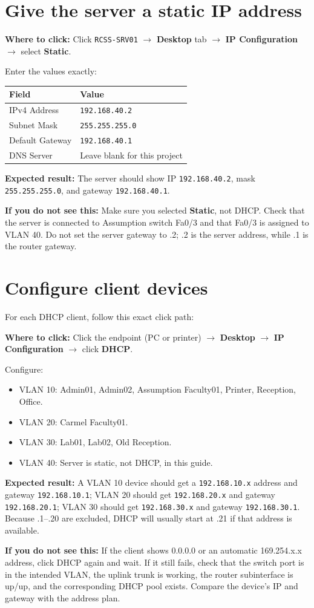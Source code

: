 \documentclass[11pt,a4paper]{article}
\newcommand{\clickpath}[1]{\noindent\colorbox{noteBG}{\parbox{0.96\linewidth}{\textbf{Where to click:} #1}}\par\vspace{5pt}}
\newcommand{\expected}[1]{\noindent\colorbox{noteBG}{\parbox{0.96\linewidth}{\textbf{Expected result:} #1}}\par\vspace{5pt}}
\newcommand{\ifnot}[1]{\noindent\colorbox{warnBG}{\parbox{0.96\linewidth}{\textbf{If you do not see this:} #1}}\par\vspace{5pt}}
\begin{document}
\section{Give the server a static IP address}\label{sec:server}
\clickpath{Click \texttt{RCSS-SRV01} \(\rightarrow\) \textbf{Desktop} tab \(\rightarrow\) \textbf{IP Configuration} \(\rightarrow\) select \textbf{Static}.}
Enter the values exactly:
\begin{center}
\begin{tabular}{@{}ll@{}}
\toprule
Field & Value\\
\midrule
IPv4 Address & \texttt{192.168.40.2}\\
Subnet Mask & \texttt{255.255.255.0}\\
Default Gateway & \texttt{192.168.40.1}\\
DNS Server & Leave blank for this project\\
\bottomrule
\end{tabular}
\end{center}
\expected{The server should show IP \texttt{192.168.40.2}, mask \texttt{255.255.255.0}, and gateway \texttt{192.168.40.1}.}
\ifnot{Make sure you selected \textbf{Static}, not DHCP. Check that the server is connected to Assumption switch Fa0/3 and that Fa0/3 is assigned to VLAN 40. Do not set the server gateway to .2; .2 is the server address, while .1 is the router gateway.}

\section{Configure client devices}\label{sec:clients}
For each DHCP client, follow this exact click path:
\clickpath{Click the endpoint (PC or printer) \(\rightarrow\) \textbf{Desktop} \(\rightarrow\) \textbf{IP Configuration} \(\rightarrow\) click \textbf{DHCP}.}
Configure:
\begin{itemize}
\item VLAN 10: Admin01, Admin02, Assumption Faculty01, Printer, Reception, Office.
\item VLAN 20: Carmel Faculty01.
\item VLAN 30: Lab01, Lab02, Old Reception.
\item VLAN 40: Server is static, not DHCP, in this guide.
\end{itemize}
\expected{A VLAN 10 device should get a \texttt{192.168.10.x} address and gateway \texttt{192.168.10.1}; VLAN 20 should get \texttt{192.168.20.x} and gateway \texttt{192.168.20.1}; VLAN 30 should get \texttt{192.168.30.x} and gateway \texttt{192.168.30.1}. Because .1--.20 are excluded, DHCP will usually start at .21 if that address is available.}
\ifnot{If the client shows 0.0.0.0 or an automatic 169.254.x.x address, click DHCP again and wait. If it still fails, check that the switch port is in the intended VLAN, the uplink trunk is working, the router subinterface is up/up, and the corresponding DHCP pool exists. Compare the device's IP and gateway with the address plan.}
\end{document}
